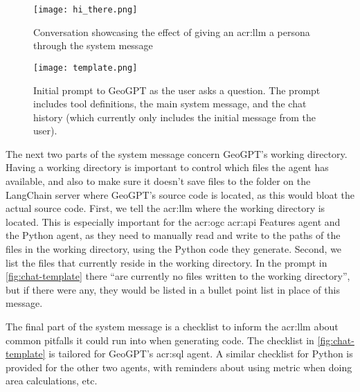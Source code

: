 \begin{figure}[H]
    \centering
    \texttt{[image: hi\_there.png]}
    \caption[LLM persona example]{Conversation showcasing the effect of giving an \acrshort{acr:llm} a persona through the system message}
    \label{fig:effect-of-system-message}
\end{figure}

\begin{figure}
    \centering
    \texttt{[image: template.png]}
    \caption[Initial prompt to GeoGPT as the user asks a question]{Initial prompt to GeoGPT as the user asks a question. The prompt includes tool definitions, the main system message, and the chat history (which currently only includes the initial message from the user).}
    \label{fig:chat-template}
\end{figure}

The next two parts of the system message concern GeoGPT's working directory. Having a working directory is important to control which files the agent has available, and also to make sure it doesn't save files to the folder on the LangChain server where GeoGPT's source code is located, as this would bloat the actual source code. First, we tell the \acrshort{acr:llm} where the working directory is located. This is especially important for the \acrshort{acr:ogc} \acrshort{acr:api} Features agent and the Python agent, as they need to manually read and write to the paths of the files in the working directory, using the Python code they generate. Second, we list the files that currently reside in the working directory. In the prompt in \autoref{fig:chat-template} there \enquote{are currently no files written to the working directory}, but if there were any, they would be listed in a bullet point list in place of this message.

The final part of the system message is a checklist to inform the \acrshort{acr:llm} about common pitfalls it could run into when generating code. The checklist in \autoref{fig:chat-template} is tailored for GeoGPT's \acrshort{acr:sql} agent. A similar checklist for Python is provided for the other two agents, with reminders about using metric  when doing area calculations, etc.

